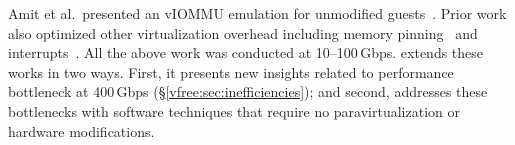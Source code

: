 

Amit et al.\ presented an vIOMMU emulation for
    unmodified guests~\cite{Amit2011vIOMMU}. Prior work also optimized other virtualization overhead including 
    memory pinning~\cite{Tian2020coIOMMU} and interrupts~\cite{Gordon2012eli, Har2013paraIO}. All the above work was conducted at 10--100\,Gbps. \vfreebrand extends these works in two ways. First, it presents new insights related to performance bottleneck at 400\,Gbps (\S\ref{vfree:sec:inefficiencies}); and second, {\vfreename} addresses these bottlenecks with software techniques that require no paravirtualization or hardware modifications.

